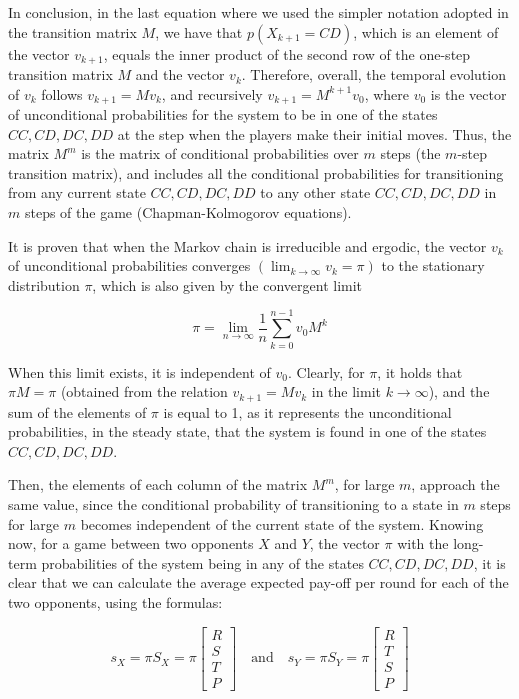 \documentclass[12pt]{report}
\begin{document}
In conclusion, in the last equation where we used the simpler notation adopted in the transition matrix \( M \), we have that \( p(X_{k+1} = CD) \), which is an element of the vector \( v_{k+1} \), equals the inner product of the second row of the one-step transition matrix \( M \) and the vector \( v_k \). Therefore, overall, the temporal evolution of \( v_k \) follows \( v_{k+1} = M v_k \), and recursively \( v_{k+1} = M^{k+1} v_0 \), where \( v_0 \) is the vector of unconditional probabilities for the system to be in one of the states \( CC, CD, DC, DD \) at the step when the players make their initial moves.  Thus, the matrix \( M^m \) is the matrix of conditional probabilities over \( m \) steps (the \( m \)-step transition matrix), and includes all the conditional probabilities for transitioning from any current state \( CC, CD, DC, DD \) to any other state \( CC, CD, DC, DD \) in \( m \) steps of the game (Chapman-Kolmogorov equations).


It is proven that when the Markov chain is irreducible and ergodic, the vector \( v_k \) of unconditional probabilities converges \( (\lim_{k \to \infty} v_k = \pi) \) to the stationary distribution \( \pi \), which is also given by the convergent limit 

\[
\pi = \lim_{n \to \infty} \frac{1}{n} \sum_{k=0}^{n-1} v_0 M^k
\]

When this limit exists, it is independent of \( v_0 \). Clearly, for \( \pi \), it holds that \( \pi M = \pi \) (obtained from the relation \( v_{k+1} = M v_k \) in the limit \( k \to \infty \)), and the sum of the elements of \( \pi \) is equal to 1, as it represents the unconditional probabilities, in the steady state, that the system is found in one of the states \( CC, CD, DC, DD \). 

Then, the elements of each column of the matrix \( M^m \), for large \( m \), approach the same value, since the conditional probability of transitioning to a state in \( m \) steps for large \( m \) becomes independent of the current state of the system. Knowing now, for a game between two opponents \( X \) and \( Y \), the vector \( \pi \) with the long-term probabilities of the system being in any of the states \( CC, CD, DC, DD \), it is clear that we can calculate the average expected pay-off per round for each of the two opponents, using the formulas:

\[
s_X = \pi S_X = \pi
\begin{bmatrix}
R \\
S \\
T \\
P
\end{bmatrix}
\quad \text{and} \quad
s_Y = \pi S_Y = \pi
\begin{bmatrix}
R \\
T \\
S \\
P
\end{bmatrix}
\]
\end{document}
